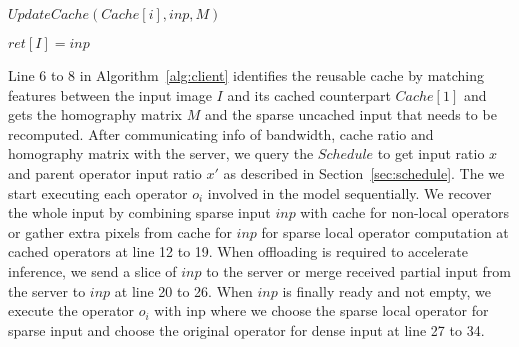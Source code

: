\begin{algorithm}[htbp]
{{{                    $UpdateCache(Cache[i], inp, M)$
                }

            }
            $ret[I] = inp$
       }
      

\end{algorithm}


Line 6 to 8 in Algorithm~\ref{alg:client} identifies the reusable cache by matching features between the input image $I$ and its cached counterpart $Cache[1]$ and gets the homography matrix $M$ and the sparse uncached input that needs to be recomputed.
After communicating info of bandwidth, cache ratio and homography matrix with the server, we query the $Schedule$ to get input ratio $x$ and parent operator input ratio $x'$ as described in Section~\ref{sec:schedule}.
The we start executing each operator $o_i$ involved in the model sequentially.
We recover the whole input by combining sparse input $inp$ with cache for non-local operators or gather extra pixels from cache for $inp$ for sparse local operator computation at cached operators at line 12 to 19.
When offloading is required to accelerate inference, we send a slice of $inp$ to the server or merge received partial input from the server to $inp$ at line 20 to 26.
When $inp$ is finally ready and not empty, we execute the operator $o_i$ with inp where we choose the sparse local operator for sparse input and choose the original operator for dense input at line 27 to 34.


